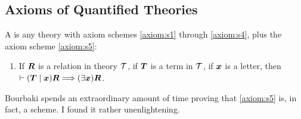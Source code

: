 \subsection{Axioms of Quantified Theories}

\begin{definition}
A  is any theory with axiom schemes
\ref{axiom:s1} through \ref{axiom:s4}, plus the axiom scheme \ref{axiom:s5}:
\begin{enumerate}[label=(S\arabic*),ref={S\arabic*},start=5]
\item\label{axiom:s5} If $\boldsymbol{R}$ is a relation in theory $\mathcal{T}$, if
  $\boldsymbol{T}$ is a term in $\mathcal{T}$, if $\boldsymbol{x}$ is
  a letter, then $\vdash(\boldsymbol{T}\mid\boldsymbol{x})\boldsymbol{R}\Longrightarrow(\exists\boldsymbol{x})\boldsymbol{R}$.
\end{enumerate}
\end{definition}

\begin{remark*}
Bourbaki spends an extraordinary amount of time proving that
\ref{axiom:s5} is, in fact, a scheme. I found it rather unenlightening.
\end{remark*}
